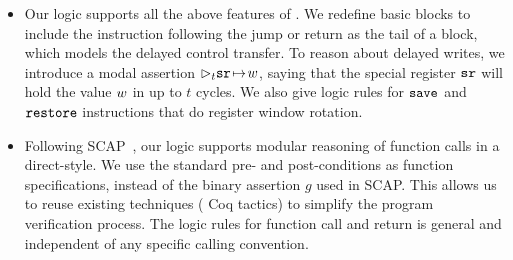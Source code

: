 
\begin{itemize}
	\item
    Our logic supports all the above features of \sparc.
    We redefine basic blocks to include the instruction
    following the jump or return as the tail of a
    block, which models the delayed control
    transfer. To reason about delayed writes, we introduce
    a modal assertion $\rhd_{t}{\texttt{sr}} \!\mapsto\! {w}$, saying that
    the special register $\texttt{sr}$ will
    hold the value $w$ in up to $t$ cycles.
    We also give
    logic rules for $\texttt{save}$ and $\texttt{restore}$ instructions
    that do register window rotation.
%
%
	
	\item
    Following SCAP~\cite{Feng06pldi}, our logic supports
    modular reasoning of function calls in a direct-style.
    We use the standard pre- and post-conditions as function
    specifications, instead of the binary assertion $g$ used
    in SCAP. This allows us to reuse existing techniques
    (\eg{} Coq tactics) to simplify the program
    verification process.
    The logic rules for function call and return is general
    and independent of any specific calling convention.
	

\end{itemize}
